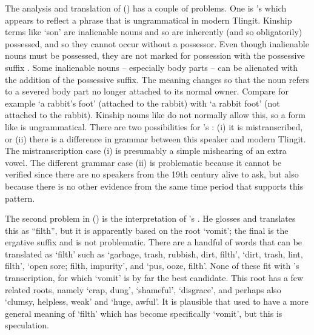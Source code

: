 The analysis and translation of (\lastx) has a couple of problems.
One is \citeauthor{swanton:1909}’s  which appears to reflect a phrase  that is ungrammatical in modern Tlingit.
Kinship terms like  ‘son’ are inalienable nouns and so are inherently (and so obligatorily) possessed, and so they cannot occur without a possessor.
Even though inalienable nouns must be possessed, they are not marked for possession with the possessive suffix .
Some inalienable nouns – especially body parts – can be alienated with the addition of the possessive suffix.
The meaning changes so that the noun refers to a severed body part no longer attached to its normal owner.
Compare for example  ‘a rabbit’s foot’ (attached to the rabbit) with  ‘a rabbit foot’ (not attached to the rabbit).
Kinship nouns like  do not normally allow this, so a form like  is ungrammatical.
There are two possibilities for \citeauthor{swanton:1909}’s : (i) it is mistranscribed, or (ii) there is a difference in grammar between this speaker and modern Tlingit.
The mistranscription case (i) is presumably a simple mishearing of an extra vowel.
The different grammar case (ii) is problematic because it cannot be verified since there are no speakers from the 19th century alive to ask, but also because there is no other evidence from the same time period that supports this pattern.

The second problem in (\lastx) is the interpretation of \citeauthor{swanton:1909}’s .
He glosses and translates this as “filth”, but it is apparently  based on the root  ‘vomit’; the final  is the ergative suffix and is not problematic.
There are a handful of words that can be translated as ‘filth’ such as  ‘garbage, trash, rubbish, dirt, filth’,  ‘dirt, trash, lint, filth’,  ‘open sore; filth, impurity’, and  ‘pus, ooze, filth’.
None of these fit with \citeauthor{swanton:1909}’s transcription, for which  ‘vomit’ is by far the best candidate.
This root  has a few related roots, namely  ‘crap, dung’,  ‘shameful’,  ‘disgrace’, and perhaps also  ‘clumsy, helpless, weak’ and  ‘huge, awful’.
It is plausible that  used to have a more general meaning of ‘filth’ which has become specifically ‘vomit’, but this is speculation.

